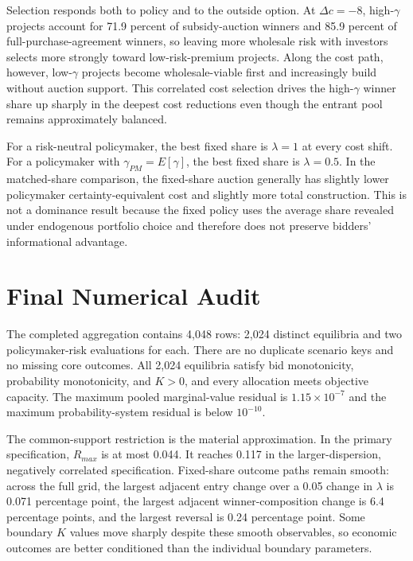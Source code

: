 \documentclass[10pt]{article}
\begin{document}
Selection responds both to policy and to the outside option.  At
$\Delta c=-8$, high-$\gamma$ projects account for 71.9 percent of subsidy-auction
winners and 85.9 percent of full-purchase-agreement winners, so leaving more
wholesale risk with investors selects more strongly toward low-risk-premium
projects.  Along the cost path, however, low-$\gamma$ projects become
wholesale-viable first and increasingly build without auction support.  This correlated cost
selection drives the high-$\gamma$ winner share up sharply in the deepest
cost reductions even though the entrant pool remains approximately balanced.

For a risk-neutral policymaker, the best fixed share is $\lambda=1$ at every
cost shift.  For a policymaker with $\gamma_{PM}=E[\gamma]$, the best fixed
share is $\lambda=0.5$.  In the matched-share comparison, the fixed-share
auction generally has slightly lower policymaker certainty-equivalent cost
and slightly more total construction.  This is not a dominance result because
the fixed policy uses the average share revealed under endogenous portfolio
choice and therefore does not preserve bidders' informational advantage.

\section{Final Numerical Audit}

The completed aggregation contains 4,048 rows: 2,024 distinct equilibria and
two policymaker-risk evaluations for each.  There are no duplicate scenario
keys and no missing core outcomes.  All 2,024 equilibria satisfy bid
monotonicity, probability monotonicity, and $K>0$, and every allocation meets
objective capacity.  The maximum pooled marginal-value residual is
$1.15\times10^{-7}$ and the maximum probability-system residual is below
$10^{-10}$.

The common-support restriction is the material approximation.  In the
primary specification, $R_{max}$ is at most 0.044.  It reaches 0.117 in the
larger-dispersion, negatively correlated specification.  Fixed-share outcome
paths remain smooth: across the full grid, the largest adjacent entry change
over a 0.05 change in $\lambda$ is 0.071 percentage point, the largest adjacent
winner-composition change is 6.4 percentage points, and the largest reversal
is 0.24 percentage point.  Some boundary $K$ values move sharply despite these
smooth observables, so economic outcomes are better conditioned than the
individual boundary parameters.
\end{document}
